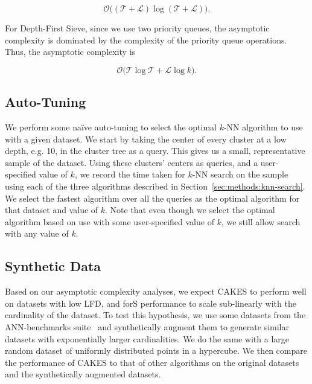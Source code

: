\begin{equation}
    \mathcal{O} \Big( ( \mathcal{T} + \mathcal{L} ) \log ( \mathcal{T} + \mathcal{L} ) \Big).
    \label{eq:methods:breadth-first-sieve-complexity}
\end{equation}

For Depth-First Sieve, since we use two priority queues, the asymptotic complexity is dominated by the complexity of the priority queue operations.
Thus, the asymptotic complexity is

\begin{equation}
    \mathcal{O} \Big( \mathcal{T} \log \mathcal{T} + \mathcal{L} \log k \Big).
    \label{eq:methods:depth-first-sieve-complexity}
\end{equation}


\subsection{Auto-Tuning}
\label{sec:methods:auto-tuning}

We perform some na\"{i}ve auto-tuning to select the optimal $k$-NN algorithm to use with a given dataset.
We start by taking the center of every cluster at a low depth, e.g. 10, in the cluster tree as a query.
This gives us a small, representative sample of the dataset.
Using these clusters' centers as queries, and a user-specified value of $k$, we record the time taken for $k$-NN search on the sample using each of the three algorithms described in Section~\ref{sec:methods:knn-search}.
We select the fastest algorithm over all the queries as the optimal algorithm for that dataset and value of $k$.
Note that even though we select the optimal algorithm based on use with some user-specified value of $k$, we still allow search with any value of $k$.


\subsection{Synthetic Data}
\label{sec:methods:synthetic-data}

Based on our asymptotic complexity analyses, we expect CAKES to perform well on datasets with low LFD, and forS performance to scale sub-linearly with the cardinality of the dataset.
To test this hypothesis, we use some datasets from the ANN-benchmarks suite~\cite{aumuller2020ann} and synthetically augment them to generate similar datasets with exponentially larger cardinalities.
We do the same with a large random dataset of uniformly distributed points in a hypercube.
We then compare the performance of CAKES to that of other algorithms on the original datasets and the synthetically augmented datasets.

